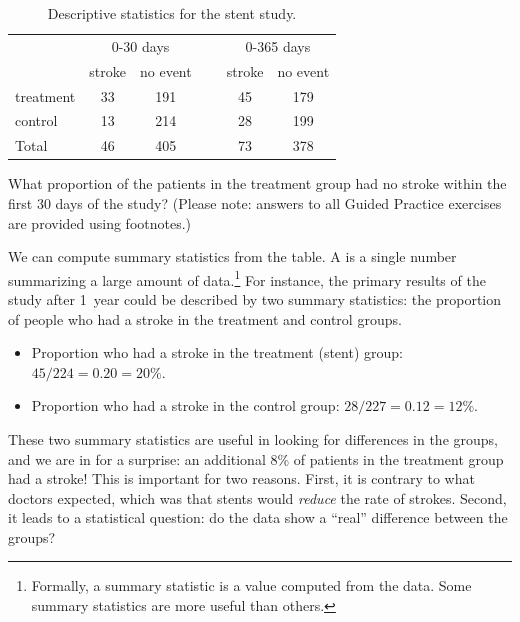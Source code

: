 \begin{table}[h]
\centering
\begin{tabular}{l cc c cc}
& \multicolumn{2}{c}{0-30 days} &\hspace{5mm}\ & \multicolumn{2}{c}{0-365 days} \\
  \cline{2-3} \cline{5-6}
	& 	stroke 	& no event && 	stroke 	& no event \\
  \hline
treatment 	& 33		& 191	&&	45 	& 179 \\
control 		& 13		& 214	&& 	28	& 199 \\
  \hline
Total				& 46		& 405	&&	73	& 378 \\
  \hline
\end{tabular}
\caption{Descriptive statistics for the stent study.}
\label{stentStudyResults}
\end{table}

\begin{exercisewrap}
\begin{nexercise}
What proportion of the patients in the treatment group had no stroke within the first 30 days of the study? (Please note: answers to all Guided Practice exercises are provided using footnotes.)\footnotemark
\end{nexercise}
\end{exercisewrap}

We can compute summary statistics from the table. A  is a single number summarizing a large amount of data.\footnote{Formally, a summary statistic is a value computed from the data. Some summary statistics are more useful than others.} For instance, the primary results of the study after 1~year could be described by two summary statistics: the proportion of people who had a stroke in the treatment and control groups.
\begin{itemize}
\setlength{\itemsep}{0mm}
\item[] Proportion who had a stroke in the treatment (stent) group: $45/224 = 0.20 = 20\%$.
\item[] Proportion who had a stroke in the control group: $28/227 = 0.12 = 12\%$.
\end{itemize}
These two summary statistics are useful in looking for differences in the groups, and we are in for a surprise: an additional 8\% of patients in the treatment group had a stroke! This is important for two reasons. First, it is contrary to what doctors expected, which was that stents would \emph{reduce} the rate of strokes. Second, it leads to a statistical question: do the data show a ``real'' difference between the groups?

